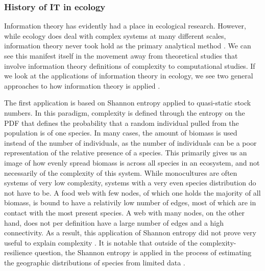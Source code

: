 \documentclass[../main.tex]{subfiles}
\begin{document}
\subsubsection{History of IT in ecology}

Information theory has evidently had a place in ecological research.
However, while ecology does deal with complex systems at many different scales, information theory never took hold as the primary analytical method \cite{ulanowicz2001information}. %
We can see this manifest itself in the movement away from theoretical studies that involve information theory definitions of complexity to computational studies.
If we look at the applications of information theory in ecology, we see two general approaches to how information theory is applied \cite{ulanowicz2001information}.

The first application is based on Shannon entropy applied to quasi-static stock numbers.
In this paradigm, complexity is defined through the entropy on the PDF that defines the probability that a random individual pulled from the population is of one species.
In many cases, the amount of biomass is used instead of the number of individuals, as the number of individuals can be a poor representation of the relative presence of a species.
This primarily gives us an image of how evenly spread biomass is across all species in an ecosystem, and not necessarily of the complexity of this system.
While monocultures are often systems of very low complexity, systems with a very even species distribution do not have to be.
A food web with few nodes, of which one holds the majority of all biomass, is bound to have a relativily low number of edges, most of which are in contact with the most present species.
A web with many nodes, on the other hand, does not per definition have a large number of edges and a high connectivity.
As a result, this application of Shannon entropy did not prove very useful to explain complexity \cite{ulanowicz2001information}.
It is notable that outside of the complexity-resilience question, the Shannon entropy is applied in the process of estimating the geographic distributions of species from limited data \cite{phillips2006maximum}. %
\end{document}
